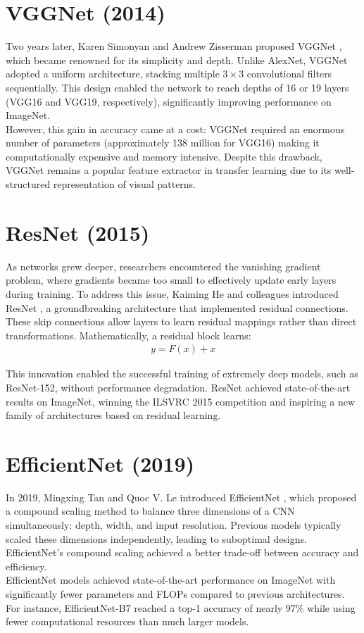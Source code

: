 \section{VGGNet (2014)}

Two years later, Karen Simonyan and Andrew Zisserman proposed VGGNet \cite{simonyan2014very}, which became renowned for its simplicity and depth. Unlike AlexNet, VGGNet adopted a uniform architecture, stacking multiple $3 \times 3$ convolutional filters sequentially. This design enabled the network to reach depths of 16 or 19 layers (VGG16 and VGG19, respectively), significantly improving performance on ImageNet.
\\
However, this gain in accuracy came at a cost: VGGNet required an enormous number of parameters (approximately 138 million for VGG16) making it computationally expensive and memory intensive. Despite this drawback, VGGNet remains a popular feature extractor in transfer learning due to its well-structured representation of visual patterns.

\section{ResNet (2015)}

As networks grew deeper, researchers encountered the vanishing gradient problem, where gradients became too small to effectively update early layers during training. To address this issue, Kaiming He and colleagues introduced ResNet \cite{he2015deep}, a groundbreaking architecture that implemented residual connections.
\\
These skip connections allow layers to learn residual mappings rather than direct transformations. Mathematically, a residual block learns:
\begin{align}
    y = F(x) + x
\end{align}

This innovation enabled the successful training of extremely deep models, such as ResNet-152, without performance degradation. ResNet achieved state-of-the-art results on ImageNet, winning the ILSVRC 2015 competition and inspiring a new family of architectures based on residual learning.

\section{EfficientNet (2019)}

In 2019, Mingxing Tan and Quoc V. Le introduced EfficientNet \cite{tan2019efficientnet}, which proposed a compound scaling method to balance three dimensions of a CNN simultaneously: depth, width, and input resolution. Previous models typically scaled these dimensions independently, leading to suboptimal designs. EfficientNet’s compound scaling achieved a better trade-off between accuracy and efficiency.
\\
EfficientNet models achieved state-of-the-art performance on ImageNet with significantly fewer parameters and FLOPs compared to previous architectures. For instance, EfficientNet-B7 reached a top-1 accuracy of nearly 97\% while using fewer computational resources than much larger models.

